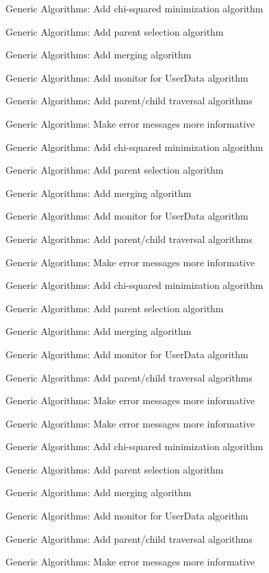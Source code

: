 
\begin{DoxyRefList}
\item[\label{todo__todo000001}%
\hypertarget{todo__todo000001}{}%
Namespace \hyperlink{namespace_h_a_l}{H\+A\+L} ]Generic Algorithms\+: Add chi-\/squared minimization algorithm 

Generic Algorithms\+: Add parent selection algorithm 

Generic Algorithms\+: Add merging algorithm 

Generic Algorithms\+: Add monitor for User\+Data algorithm 

Generic Algorithms\+: Add parent/child traversal algorithms 

Generic Algorithms\+: Make error messages more informative 

Generic Algorithms\+: Add chi-\/squared minimization algorithm 

Generic Algorithms\+: Add parent selection algorithm 

Generic Algorithms\+: Add merging algorithm 

Generic Algorithms\+: Add monitor for User\+Data algorithm 

Generic Algorithms\+: Add parent/child traversal algorithms 

Generic Algorithms\+: Make error messages more informative 

Generic Algorithms\+: Add chi-\/squared minimization algorithm 

Generic Algorithms\+: Add parent selection algorithm 

Generic Algorithms\+: Add merging algorithm 

Generic Algorithms\+: Add monitor for User\+Data algorithm 

Generic Algorithms\+: Add parent/child traversal algorithms 

Generic Algorithms\+: Make error messages more informative 

Generic Algorithms\+: Make error messages more informative 

Generic Algorithms\+: Add chi-\/squared minimization algorithm 

Generic Algorithms\+: Add parent selection algorithm 

Generic Algorithms\+: Add merging algorithm 

Generic Algorithms\+: Add monitor for User\+Data algorithm 

Generic Algorithms\+: Add parent/child traversal algorithms 

Generic Algorithms\+: Make error messages more informative 


\end{DoxyRefList}
